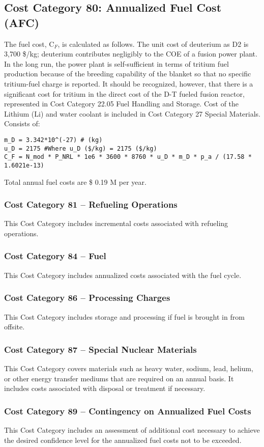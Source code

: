 \subsection{Cost Category 80: Annualized Fuel Cost (AFC)}

The fuel cost, C$_{F}$, is calculated as follows.  The unit cost of deuterium as D2 is 3,700 \$/kg; deuterium contributes negligibly to the COE of a fusion power plant. In the long run, the power plant is self-sufficient in terms of tritium fuel production because of the breeding capability of the blanket so that no specific tritium-fuel charge is reported. It should be recognized, however, that there is a significant cost for tritium in the direct cost of the D-T fueled fusion reactor, represented in Cost Category 22.05 Fuel Handling and Storage. Cost of the Lithium (Li) and water coolant is included in Cost Category 27 Special Materials.\\

Consists of:  
\begin{verbatim} 
m_D = 3.342*10^(-27) # (kg)
u_D = 2175 #Where u_D ($/kg) = 2175 ($/kg) 
C_F = N_mod * P_NRL * 1e6 * 3600 * 8760 * u_D * m_D * p_a / (17.58 * 1.6021e-13)
\end{verbatim} 

Total annual fuel costs are \$ 0.19 M per year.

\subsubsection*{Cost Category 81 – Refueling Operations}
This Cost Category includes incremental costs associated with refueling operations.

\subsubsection*{Cost Category 84 – Fuel}
This Cost Category includes annualized costs associated with the fuel cycle.

\subsubsection*{Cost Category 86 – Processing Charges}
This Cost Category includes storage and processing if fuel is brought in from offsite.

\subsubsection*{Cost Category 87 – Special Nuclear Materials}
This Cost Category covers materials such as heavy water, sodium, lead, helium, or other energy transfer mediums that are required on an annual basis. It includes costs associated with disposal or treatment if necessary. 

\subsubsection*{Cost Category 89 – Contingency on Annualized Fuel Costs}
This Cost Category includes an assessment of additional cost necessary to achieve the desired confidence level for the annualized fuel costs not to be exceeded.
